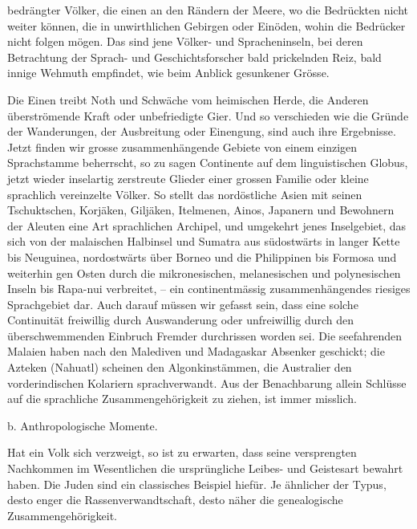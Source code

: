  bedrängter Völker, die einen an den Rändern der Meere, wo die Bedrückten nicht weiter können, die  in unwirthlichen Gebirgen oder Einöden, wohin die Bedrücker nicht folgen mögen. Das sind jene Völker- und Spracheninseln, bei deren Betrachtung der Sprach- und Geschichtsforscher bald prickelnden Reiz, bald innige Wehmuth empfindet, wie beim Anblick gesunkener Grösse.

Die Einen treibt Noth und Schwäche vom heimischen Herde, die Anderen überströmende Kraft oder unbefriedigte Gier. Und so verschieden wie die Gründe der Wanderungen, der Ausbreitung oder Einengung, sind auch ihre Ergebnisse. Jetzt finden wir grosse zusammenhängende Gebiete von einem einzigen Sprachstamme beherrscht, so zu sagen Continente auf dem linguistischen Globus, jetzt wieder inselartig zerstreute Glieder einer grossen Familie oder kleine sprachlich vereinzelte Völker. So stellt das nordöstliche Asien mit seinen Tschuktschen, Korjäken, Giljäken, Itelmenen, Ainos, Japanern und Bewohnern der Aleuten eine Art sprachlichen Archipel, und umgekehrt jenes Inselgebiet, das sich von der malaischen Halbinsel und Sumatra aus südostwärts in langer Kette bis Neuguinea, nordostwärts über Borneo und die Philippinen bis Formosa und weiterhin gen Osten durch die mikronesischen, melanesischen und polynesischen Inseln bis Rapa-nui verbreitet, – ein continentmässig zusammenhängendes riesiges Sprachgebiet dar. Auch darauf müssen wir gefasst sein, dass eine solche Continuität freiwillig durch Auswanderung oder unfreiwillig durch den überschwemmenden Einbruch Fremder durchrissen worden sei. Die seefahrenden Malaien haben nach den Malediven und Madagaskar Absenker geschickt; die Azteken (Nahuatl) scheinen den Algonkinstämmen, die Australier den vorderindischen Kolariern sprachverwandt. Aus der Benachbarung allein Schlüsse auf die sprachliche Zusammengehörigkeit zu ziehen, ist immer misslich.

b. Anthropologische Momente.\label{III.I.I.2Ab}

Hat ein Volk sich verzweigt, so ist zu erwarten, dass seine versprengten Nachkommen im Wesentlichen die ursprüngliche Leibes- und Geistesart bewahrt haben. Die Juden sind ein classisches Beispiel hiefür. \label{fp.157} Je ähnlicher der Typus, desto enger die Rassenverwandtschaft, desto näher die genealogische Zusammengehörigkeit.

